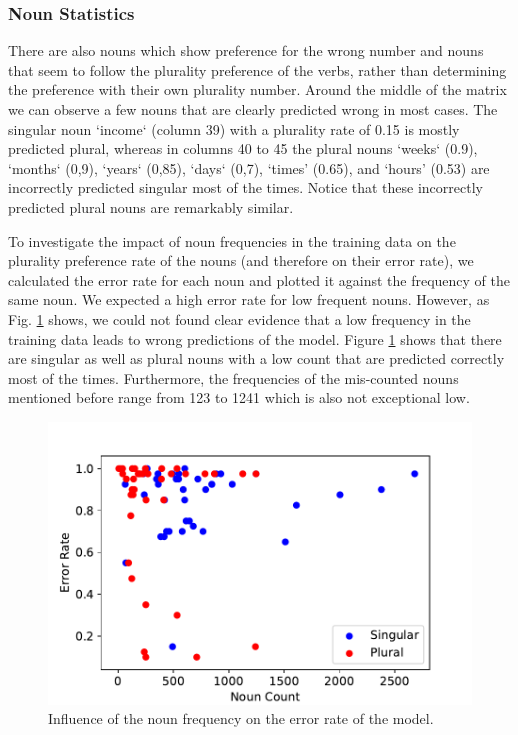 \subsubsection{Noun Statistics}

There are also nouns which show preference for the wrong number and nouns
that seem to follow the plurality preference of the verbs, 
rather than determining the preference with their own plurality number.
Around the middle of the matrix we can observe a few nouns that are clearly predicted wrong in most cases. The singular noun `income` (column 39) with a plurality rate of 0.15 is mostly predicted plural, whereas in columns 40 to 45 the plural nouns `weeks` (0.9), `months` (0,9), `years` (0,85), `days` (0,7), `times' (0.65), and `hours' (0.53) are incorrectly predicted singular most of the times. Notice that these incorrectly predicted
plural nouns are remarkably similar.

To investigate the impact of noun frequencies in the training data on the plurality 
preference rate of the nouns (and therefore on their error rate), 
we calculated the error rate for each noun and plotted it against the frequency of the same noun. 
We expected a high error rate for low frequent nouns. 
However, as Fig. \ref{fig:noun_freq_error} shows, we could not found clear evidence 
that a low frequency in the training data leads to wrong predictions of the model. 
Figure \ref{fig:noun_freq_error} shows that there are singular as well as plural nouns 
with a low count that are predicted correctly most of the times.
Furthermore, the frequencies of the mis-counted nouns mentioned before
range from 123 to 1241 which is also not exceptional low.
 
         \begin{figure}
          \centering
        \includegraphics[scale=0.5]{noun_freq_error_rate.pdf}
        \caption{Influence of the noun frequency on the error rate of the model.}
        \label{fig:noun_freq_error}
    \end{figure}
    
